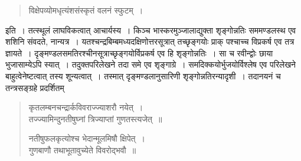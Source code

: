\documentclass[11pt, openany]{book}
\begin{document}
\begin{quote} 
{\qt विक्षेपव्योमधृत्यंशसंस्कृतं वलनं स्फुटम्~।}
\end{quote}  
इति~। तत्स्थूलं लाघविकत्वात् आचार्यस्य~। किञ्च भास्करमुञ्जालाद्युक्ता शृङ्गोन्नतिः सममण्डलस्थ एव शशिनि संवदते, नान्यत्र~। यतश्चन्द्रबिम्बमध्यदक्षिणोत्तरसूत्रात् तच्छृङ्गयोः प्राक् पश्चाच्च विप्रकर्ष एव तत्र ज्ञायते~। दृङ्मण्डलसमतिरश्चीनसूत्राच्छृङ्गयोर्विप्रकर्ष एव हि
शृङ्गोन्नतिः~। सा च रवीन्द्वोः छाया भुजासाम्येऽपि स्यात्~। तदुक्तपरिलेखने तदा समे एव शृङ्गाग्रे~। समदिक्कयोर्भुजयोर्विश्लेष एव परिलेखने बाहुत्वेनेष्टत्वात् तस्य शून्यत्वात्~। तस्मात् दृङ्मण्डलानुसारिणी शृङ्गोन्नतिरन्यादृशी~। तदानयनं च तन्त्रसङ्ग्रहे प्रदर्शितम्\textendash  

\begin{quote}
{\qt कृतलम्बनचन्द्रार्कविवराज्ज्याशरौ नयेत्~।\\
 तज्ज्यामिन्दुनतीषुघ्नां त्रिज्याप्तां गुणतस्त्यजेत्~॥
 
नतीषुफलकृत्योश्च भेदान्मूलमिषौ क्षिपेत्~।\\
गुणबाणौ तथाभूतावुच्येते विवरोद्भवौ~॥}
\end{quote}

\newpage
\end{document}
